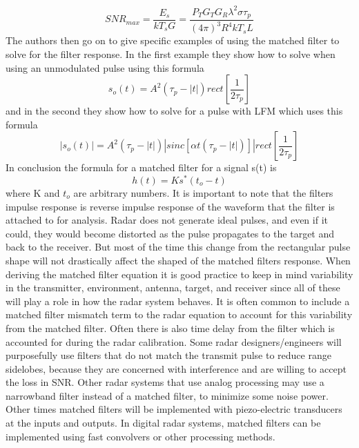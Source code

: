 \documentclass[12pt]{article}
\begin{document}
\begin{equation}
    SNR_{max} = \frac{E_s}{kT_s G} = \frac{P_T G_T G_R \lambda^2 \sigma \tau_p}{ (4\pi)^3 R^4 k T_s L }
\end{equation}
The authors then go on to give specific examples of using the matched filter to solve for the filter response. In the first example they show how to solve when using an unmodulated pulse using this formula
\begin{equation}
    s_o(t) = A^2 (\tau_p - |t|) rect \left[ \frac{1}{2\tau_p} \right]
\end{equation}
and in the second they show how to solve for a pulse with LFM which uses this formula 
\begin{equation}
    |s_o(t)| = A^2 (\tau_p - |t|) |sinc \left[\alpha t(\tau_p-|t|) \right]| rect \left[ \frac{1}{2\tau_p} \right]
\end{equation}
In conclusion the formula for a matched filter for a signal s(t) is
\begin{equation}
    h(t) = Ks^* (t_o -t)
\end{equation}
where K and $t_o$ are arbitrary numbers. It is important to note that the filters impulse response is reverse impulse response of the waveform that the filter is attached to for analysis. Radar does not generate ideal pulses, and even if it could, they would become distorted as the pulse propagates to the target and back to the receiver. But most of the time this change from the rectangular pulse shape will not drastically affect the shaped of the matched filters response. When deriving the matched filter equation it is good practice to keep in mind variability  in the transmitter, environment, antenna, target, and receiver since all of these will play a role in how the radar system behaves. It is often common to include a matched filter mismatch term to the radar equation to account for this variability from the matched filter. Often there is also time delay from the filter which is accounted for during the radar calibration. Some radar designers/engineers will purposefully use filters that do not match the transmit pulse to reduce range sidelobes, because they are concerned with interference and are willing to accept the loss in SNR. Other radar systems that use analog processing may use a narrowband filter instead of a matched filter, to minimize some noise power. Other times matched filters will be implemented with piezo-electric transducers at the inputs and outputs. In digital radar systems, matched filters can be implemented using fast convolvers or other processing methods. 
\end{document}
